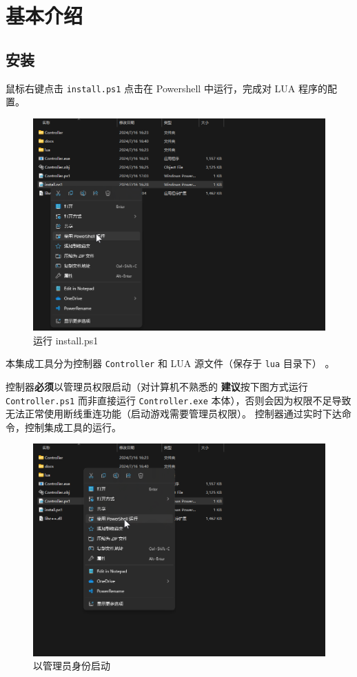 \section{基本介绍}

\subsection{安装}

鼠标右键点击 \lstinline{install.ps1} 点击在 Powershell 中运行，完成对 LUA 程序的配置。

\begin{figure}[H]
    \Centering
    \includegraphics[width=\textwidth]{docs/assets/install.png}
    \caption{运行 install.ps1}
\end{figure}

本集成工具分为控制器 \lstinline{Controller} 和 LUA 源文件（保存于 \lstinline{lua} 目录下） 。

控制器\textbf{必须}以管理员权限启动（对计算机不熟悉的 \textbf{建议}按下图方式运行 \lstinline{Controller.ps1} 而非直接运行 \lstinline{Controller.exe} 本体），否则会因为权限不足导致无法正常使用断线重连功能（启动游戏需要管理员权限）。
控制器通过实时下达命令，控制集成工具的运行。

\begin{figure}[H]
    \Centering
    \includegraphics[width=\textwidth]{docs/assets/runas.png}
    \caption{以管理员身份启动}
\end{figure}

